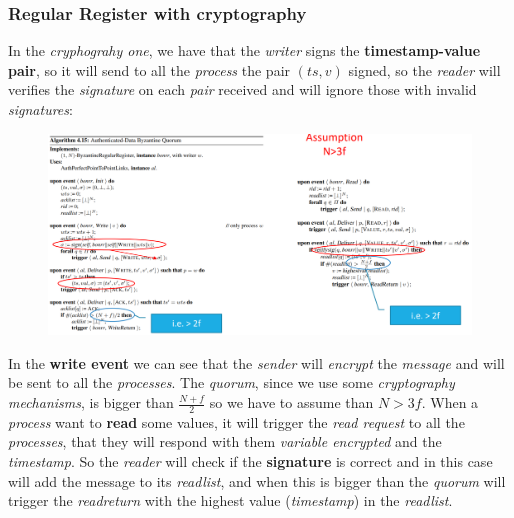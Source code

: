 \documentclass{article}
\begin{document}
\subsubsection{Regular Register with cryptography}
In the \emph{cryphograhy one}, we have that the \emph{writer} signs the \textbf{timestamp-value pair}, so it will send to all the \emph{process} the pair $(ts,v)$ signed, so the \emph{reader} will verifies the \emph{signature} on each \emph{pair} received and will ignore those with invalid \emph{signatures}:
\begin{figure}[H]
  \centering
  \includegraphics[scale=0.85,left]{cattura90.png}
\end{figure}
In the \textbf{write event} we can see that the \emph{sender} will \emph{encrypt} the \emph{message} and will be sent to all the \emph{processes}. The \emph{quorum}, since we use some \emph{cryptography mechanisms}, is bigger than $\frac{N+f}{2}$ so we have to assume than $N>3f$. When a \emph{process} want to \textbf{read} some values, it will trigger the \emph{read request} to all the \emph{processes}, that they will respond with them \emph{variable encrypted} and the \emph{timestamp}. So the \emph{reader} will check if the \textbf{signature} is correct and in this case will add the message to its \emph{readlist}, and when this is bigger than the \emph{quorum} will trigger the \emph{readreturn} with the highest value (\emph{timestamp}) in the \emph{readlist}. 
\end{document}

